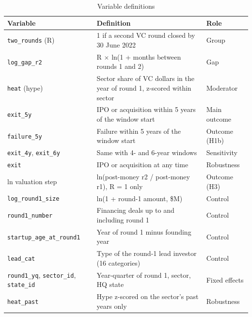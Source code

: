 \begin{table}[tbp]
\centering\footnotesize
\caption{Variable definitions}
\label{tab:T4}
\begin{tabular}{p{3.4cm}p{7.6cm}p{2.6cm}}
\toprule
Variable & Definition & Role \\
\midrule
\texttt{two\_rounds} (R) & 1 if a second VC round closed by 30 June 2022 & Group \\
\texttt{log\_gap\_r2} & R $\times$ ln(1 + months between rounds 1 and 2) & Gap \\
\texttt{heat} (hype) & Sector share of VC dollars in the year of round 1, z-scored within sector & Moderator \\
\texttt{exit\_5y} & IPO or acquisition within 5 years of the window start & Main outcome \\
\texttt{failure\_5y} & Failure within 5 years of the window start & Outcome (H1b) \\
\texttt{exit\_4y}, \texttt{exit\_6y} & Same with 4- and 6-year windows & Sensitivity \\
\texttt{exit} & IPO or acquisition at any time & Robustness \\
ln valuation step & ln(post-money r2 / post-money r1), R = 1 only & Outcome (H3) \\
\texttt{log\_round1\_size} & ln(1 + round-1 amount, \$M) & Control \\
\texttt{round1\_number} & Financing deals up to and including round 1 & Control \\
\texttt{startup\_age\_at\_round1} & Year of round 1 minus founding year & Control \\
\texttt{lead\_cat} & Type of the round-1 lead investor (16 categories) & Control \\
\texttt{round1\_yq}, \texttt{sector\_id}, \texttt{state\_id} & Year-quarter of round 1, sector, HQ state & Fixed effects \\
\texttt{heat\_past} & Hype z-scored on the sector's past years only & Robustness \\
\bottomrule
\end{tabular}

\end{table}
